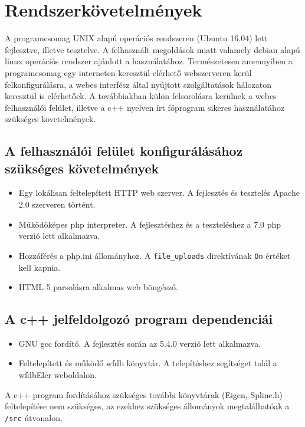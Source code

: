 \documentclass[oneside,titlepage,12pt,a4paper]{report}
\begin{document}
\section{Rendszerkövetelmények}

A programcsomag UNIX alapú operációs rendszeren (Ubuntu 16.04) lett fejlesztve, illetve tesztelve. A felhasznált megoldások miatt valamely debian alapú linux operációs rendszer ajánlott a használatához. Természetesen amennyiben a programcsomag egy interneten keresztül elérhető webszerveren kerül felkonfigurálásra, a webes interfész által nyújtott szolgáltatások hálozaton keresztül is elérhetőek. A továbbiakban külön felsorolásra kerülnek a webes felhasználói felület, illetve a c++ nyelven írt főprogram sikeres használatához szükséges követelmények.

\subsection*{A felhasználói felület konfigurálásához szükséges követelmények}

\begin{itemize}
\item Egy lokálisan feltelepített HTTP web szerver. A fejlesztés és tesztelés Apache 2.0 szerveren történt.
\item Működőképes php interpreter. A fejlesztéshez és a teszteléshez a 7.0 php verzió lett alkalmazva. 
\item Hozzáférés a php.ini állományhoz. A \texttt{file\_uploads} direktívának \texttt{On} értéket kell kapnia.
\item HTML 5 parsolásra alkalmas web böngésző. 
\end{itemize}

\subsection*{A c++ jelfeldolgozó program dependenciái}

\begin{itemize}
\item GNU gcc fordító. A fejlesztés során az 5.4.0 verzió lett alkalmazva.
\item Feltelepített és működő wfdb könyvtár. A telepítéshez segítséget talál a {wfdbEler} weboldalon.
\end{itemize}

\noindent A c++ program fordításához szükséges további könyvtárak (Eigen, Spline.h) feltelepítése nem szükséges, az ezekhez szükséges állományok megtalálhatóak a \texttt{/src} útvonalon.
\end{document}
